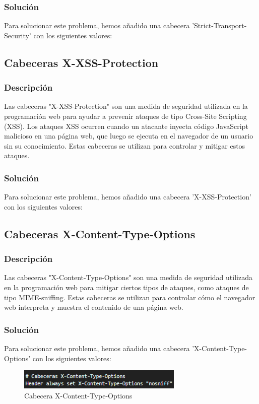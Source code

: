 \documentclass{report}
\begin{document}
                \subsubsection{Solución}
                    Para solucionar este problema, hemos añadido una cabecera 'Strict-Transport-Security' con los siguientes valores:
            \clearpage
            \subsection{Cabeceras X-XSS-Protection}
                \subsubsection{Descripción}
                Las cabeceras "X-XSS-Protection" son una medida de seguridad utilizada en la programación web para ayudar a prevenir ataques de tipo Cross-Site Scripting (XSS). Los ataques XSS ocurren cuando un atacante inyecta código JavaScript malicioso en una página web, que luego se ejecuta en el navegador de un usuario sin su conocimiento. Estas cabeceras se utilizan para controlar y mitigar estos ataques.
                \subsubsection{Solución}
                    Para solucionar este problema, hemos añadido una cabecera 'X-XSS-Protection' con los siguientes valores:
            \clearpage
            \subsection{Cabeceras X-Content-Type-Options}
                \subsubsection{Descripción}
                Las cabeceras "X-Content-Type-Options" son una medida de seguridad utilizada en la programación web para mitigar ciertos tipos de ataques, como ataques de tipo MIME-sniffing. Estas cabeceras se utilizan para controlar cómo el navegador web interpreta y muestra el contenido de una página web.
                \subsubsection{Solución}
                    Para solucionar este problema, hemos añadido una cabecera 'X-Content-Type-Options' con los siguientes valores:
                    \begin{figure}[H]
                        \centering
                        \includegraphics[width=0.7\textwidth]{./img/vulnerabilidades/3.5.7.1.png}
                        \caption{Cabecera X-Content-Type-Options}
                    \end{figure}
            \clearpage
\end{document}
